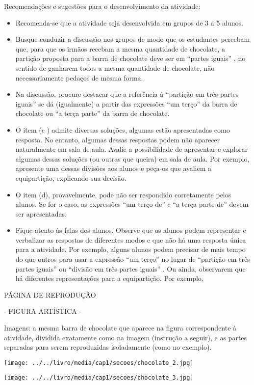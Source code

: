 \documentclass{book}
\begin{document}
  Recomendações e sugestões para o desenvolvimento da atividade:
\begin{itemize} %
    \item       Recomenda-se que a atividade seja desenvolvida em grupos de 3 a 5 alunos.
    \item       Busque conduzir a discussão nos grupos de modo que os estudantes percebam que, para que os irmãos recebam a mesma quantidade de chocolate, a partição proposta para a barra de chocolate deve ser em       ``partes iguais''      , no sentido de ganharem todos a mesma quantidade de chocolate, não necessariamente pedaços de mesma forma.
    \item       Na discussão, procure destacar que a referência à       ``partição em três partes iguais''       se dá (igualmente) a partir das expressões       ``um terço''       da barra de chocolate ou       ``a terça parte''       da barra de chocolate.
    \item       O item (c ) admite diversas soluções, algumas estão apresentadas como resposta. No entanto, algumas dessas respostas podem não aparecer naturalmente em sala de aula. Avalie a possibilidade de apresentar e explorar algumas dessas soluções (ou outras que queira) em sala de aula. Por exemplo, apresente uma dessas divisões aos alunos e peça-os que avaliem a equipartição, explicando sua decisão.
    \item       O item (d), provavelmente, pode não ser respondido corretamente pelos alunos. Se for o caso, as expressões       ``um terço de''       e       ``a terça parte de''       devem ser apresentadas.
    \item       Fique atento às falas dos alunos. Observe que os alunos podem representar e verbalizar as respostas de diferentes modos e que não há uma resposta única para a atividade. Por exemplo, alguns alunos podem precisar de mais tempo do que outros para usar a expressão       ``um terço''       no lugar de       ``partição em três partes iguais''       ou       ``divisão em três partes iguais''      . Ou ainda, observarem que há diferentes representações para a equipartição. Por exemplo,
\end{itemize} %


  \begin{imagem*}[breakable]{}{}
    PÁGINA DE REPRODUÇÃO

    - FIGURA ARTÍSTICA -

    Imagens: a mesma barra de chocolate que aparece na figura correspondente à atividade, dividida exatamente como na imagem (instrução a seguir), e as partes separadas para serem reproduzidas isoladamente (como no exemplo).

        \texttt{[image: ../../livro/media/cap1/secoes/chocolate\_2.jpg]}

        \texttt{[image: ../../livro/media/cap1/secoes/chocolate\_3.jpg]}
  \end{imagem*}
\end{document}
